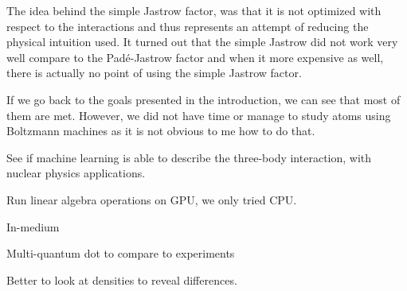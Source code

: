 The idea behind the simple Jastrow factor, was that it is not optimized with respect to the interactions and thus represents an attempt of reducing the physical intuition used. It turned out that the simple Jastrow did not work very well compare to the Padé-Jastrow factor and when it more expensive as well, there is actually no point of using the simple Jastrow factor.

If we go back to the goals presented in the introduction, we can see that most of them are met. However, we did not have time or manage to study atoms using Boltzmann machines as it is not obvious to me how to do that. 

See if machine learning is able to describe the three-body interaction, with nuclear physics applications. 

Run linear algebra operations on GPU, we only tried CPU. 

In-medium

Multi-quantum dot to compare to experiments

Better to look at densities to reveal differences. 